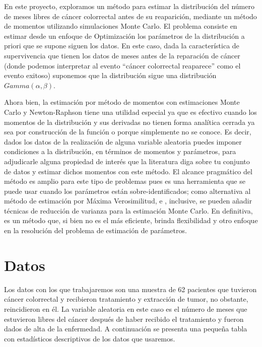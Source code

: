 \documentclass[9pt,twocolumn,twoside,]{pnas-new}
\begin{document}
En este proyecto, exploramos un método para estimar la distribución del
número de meses libres de cáncer colorrectal antes de su reaparición,
mediante un método de momentos utilizando simulaciones Monte Carlo. El
problema consiste en estimar desde un enfoque de Optimización los
parámetros de la distribución a priori que se supone siguen los datos.
En este caso, dada la característica de supervivencia que tienen los
datos de meses antes de la reparación de cáncer (donde podemos
interpretar al evento ``cáncer colorrectal reaparece'' como el evento
exitoso) suponemos que la distribución sigue una distribución
\(Gamma(\alpha, \beta)\).

Ahora bien, la estimación por método de momentos con estimaciones Monte
Carlo y Newton-Raphson tiene una utilidad especial ya que es efectivo
cuando los momentos de la distribución y sus derivadas no tienen forma
analítica cerrada ya sea por construcción de la función o porque
simplemente no se conoce. Es decir, dados los datos de la realización de
alguna variable aleatoria puedes imponer condiciones a la distribución,
en términos de momentos y parámetros, para adjudicarle alguna propiedad
de interés que la literatura diga sobre tu conjunto de datos y estimar
dichos momentos con este método. El alcance pragmático del método es
amplio para este tipo de problemas pues es una herramienta que se puede
usar cuando los parámetros están sobre-identificados; como alternativa
al método de estimación por Máxima Verosimilitud, e , inclusive, se
pueden añadir técnicas de reducción de varianza para la estimación Monte
Carlo. En definitiva, es un método que, si bien no es el más eficiente,
brinda flexibilidad y otro enfoque en la resolución del problema de
estimación de parámetros.

\hypertarget{datos}{%
\section*{Datos}\label{datos}}

Los datos con los que trabajaremos son una muestra de 62 pacientes que
tuvieron cáncer colorrectal y recibieron tratamiento y extracción de
tumor, no obstante, reincidieron en él. La variable aleatoria en este
caso es el número de meses que estuvieron libres del cáncer después de
haber recibido el tratamiento y fueron dados de alta de la enfermedad. A
continuación se presenta una pequeña tabla con estadísticos descriptivos
de los datos que usaremos.
\end{document}
